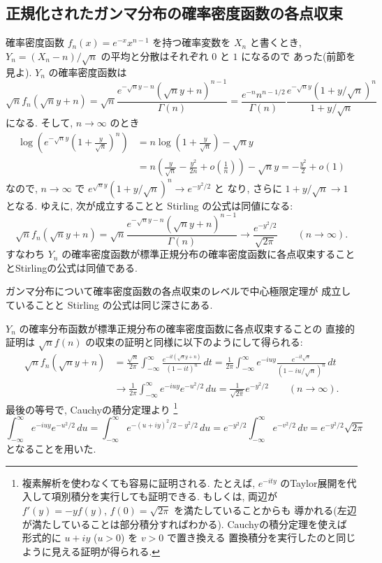 \documentclass[12pt,twoside]{jarticle}
\theoremstyle{jplain}
\theoremstyle{jplain}
\theoremstyle{jplain}
\numberwithin{theorem}{section}
\numberwithin{equation}{section}
\numberwithin{figure}{section}
\numberwithin{table}{section}
\begin{document}

\subsection{正規化されたガンマ分布の確率密度函数の各点収束}

確率密度函数 $f_n(x)=e^{-x}x^{n-1}$ を持つ確率変数を $X_n$ と書くとき,
$Y_n=(X_n-n)/\sqrt{n}$ の平均と分散はそれぞれ $0$ と $1$ になるので
あった(前節を見よ).  $Y_n$ の確率密度函数は
\[
\sqrt{n}f_n(\sqrt{n}y+n)
=\sqrt{n}\frac{e^{-\sqrt{n}y-n}(\sqrt{n}y+n)^{n-1}}{\Gamma(n)}
=\frac{e^{-n}n^{n-1/2}}{\Gamma(n)}
 \frac{e^{-\sqrt{n}y}(1+y/\sqrt{n})^n}{1+y/\sqrt{n}}
\]
になる. そして, $n\to\infty$ のとき
\begin{align*}
\log\left(e^{-\sqrt{n}y}\left(1+\frac{y}{\sqrt{n}}\right)^n\right)
&=
n\log\left(1+\frac{y}{\sqrt{n}}\right)-\sqrt{n}y
\\ &
=n\left(\frac{y}{\sqrt{n}}-\frac{y^2}{2n}+o\left(\frac{1}{n}\right)\right)
-\sqrt{n}y
=-\frac{y^2}{2}+o(1)
\end{align*}
なので, $n\to\infty$ で $e^{\sqrt{n}y}(1+y/\sqrt{n})^n\to e^{-y^2/2}$ と
なり, さらに $1+y/\sqrt{n}\to 1$ となる.
ゆえに, 次が成立することと Stirling の公式は同値になる:
\[
\sqrt{n}f_n(\sqrt{n}y+n)
=\sqrt{n}\frac{e^{-\sqrt{n}y-n}(\sqrt{n}y+n)^{n-1}}{\Gamma(n)}
\longrightarrow
\frac{e^{-y^2/2}}{\sqrt{2\pi}}
\qquad (n\to\infty).
\]
すなわち $Y_n$ の確率密度函数が標準正規分布の確率密度函数に各点収束すること
とStirlingの公式は同値である.

ガンマ分布について確率密度函数の各点収束のレベルで中心極限定理が
成立していることと Stirling の公式は同じ深さにある.

$Y_n$ の確率分布函数が標準正規分布の確率密度函数に各点収束することの
直接的証明は $\sqrt{n}f(n)$ の収束の証明と同様に以下のようにして得られる:
\begin{align*}
\sqrt{n}f_n(\sqrt{n}y+n)
&=
\frac{\sqrt{n}}{2\pi}
\int_{-\infty}^\infty
\frac{e^{-it(\sqrt{n}y+n)}}{(1-it)^n}\,dt
=\frac{1}{2\pi}
\int_{-\infty}^\infty
e^{-iuy}\frac{e^{-it\sqrt{n}}}{(1-iu/\sqrt{n})^n}\,dt
\\ &
\longrightarrow
\frac{1}{2\pi}
\int_{-\infty}^\infty e^{-iuy}e^{-u^2/2}\,du
=
\frac{1}{\sqrt{2\pi}}e^{-y^2/2}
\qquad(n\to\infty).
\end{align*}
最後の等号で, Cauchyの積分定理より%
\footnote{複素解析を使わなくても容易に証明される.
たとえば, $e^{-ity}$ のTaylor展開を代入して項別積分を実行しても証明できる.
もしくは, 両辺が $f'(y)=-y f(y)$, $f(0)=\sqrt{2\pi}$ を満たしていることからも
導かれる(左辺が満たしていることは部分積分すればわかる).
Cauchyの積分定理を使えば
形式的に $u+iy$ ($u>0$) を $v>0$ で置き換える
置換積分を実行したのと同じように見える証明が得られる.}
\[
\int_{-\infty}^\infty e^{-iuy}e^{-u^2/2}\,du
=\int_{-\infty}^\infty e^{-(u+iy)^2/2-y^2/2}\,du
=e^{-y^2/2}\int_{-\infty}^\infty e^{-v^2/2}\,dv
=e^{-y^2/2}\sqrt{2\pi}
\]
となることを用いた.
\end{document}
